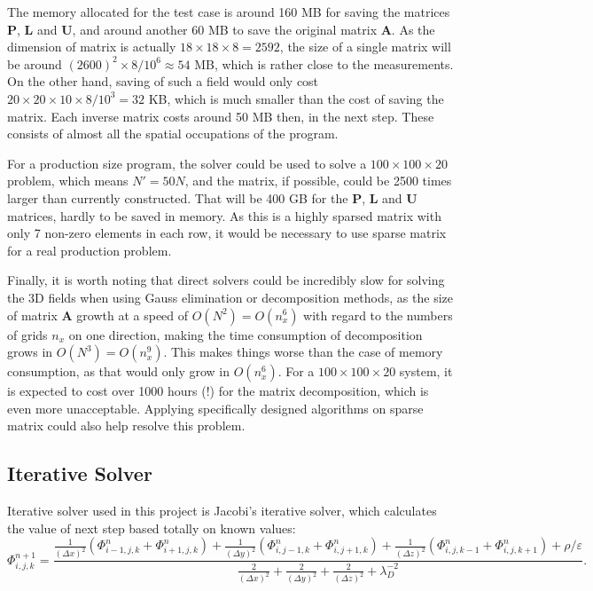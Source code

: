 \documentclass{article}
\begin{document}
\begin{spacing}{1.1}
The memory allocated for the test case is around 160 MB for saving the matrices $\mathbf{P}$, $\mathbf{L}$ and $\mathbf{U}$, and around another 60 MB to save the original matrix $\mathbf{A}$. As the dimension of matrix is actually $18\times 18\times 8 = 2592$, the size of a single matrix will be around $(2600)^2\times 8/10^6\approx 54$ MB, which is rather close to the measurements. On the other hand, saving of such a field would only cost $20\times 20\times 10\times 8/10^3 = 32$ KB, which is much smaller than the cost of saving the matrix. Each inverse matrix costs around 50 MB then, in the next step. These consists of almost all the spatial occupations of the program.

For a production size program, the solver could be used to solve a $100\times 100\times 20$ problem, which means $N'=50N$, and the matrix, if possible, could be 2500 times larger than currently constructed. That will be 400 GB for the $\mathbf{P}$, $\mathbf{L}$ and $\mathbf{U}$ matrices, hardly to be saved in memory. As this is a highly sparsed matrix with only 7 non-zero elements in each row, it would be necessary to use sparse matrix for a real production problem.

Finally, it is worth noting that direct solvers could be incredibly slow for solving the 3D fields when using Gauss elimination or decomposition methods, as the size of matrix $\mathbf{A}$ growth at a speed of $O(N^2)=O(n_x^6)$ with regard to the numbers of grids $n_x$ on one direction, making the time consumption of decomposition grows in $O(N^3)=O(n_x^9)$. This makes things worse than the case of memory consumption, as that would only grow in $O(n_x^6)$. For a $100\times 100\times 20$ system, it is expected to cost over 1000 hours (!) for the matrix decomposition, which is even more unacceptable. Applying specifically designed algorithms on sparse matrix could also help resolve this problem.

\subsection{Iterative Solver}

Iterative solver used in this project is Jacobi's iterative solver, which calculates the value of next step based totally on known values:
\[\Phi^{n+1}_{i,j,k} = \frac{\frac{1}{(\Delta x)^2}(\Phi^{n}_{i-1,j,k}+\Phi^{n}_{i+1,j,k})+\frac{1}{(\Delta y)^2}(\Phi^{n}_{i,j-1,k}+\Phi^{n}_{i,j+1,k})+\frac{1}{(\Delta z)^2}(\Phi^{n}_{i,j,k-1}+\Phi^{n}_{i,j,k+1})+\rho/\varepsilon}{\frac{2}{(\Delta x)^2}+\frac{2}{(\Delta y)^2}+\frac{2}{(\Delta z)^2}+\lambda_D^{-2}}.\]


\end{spacing}
\end{document}
